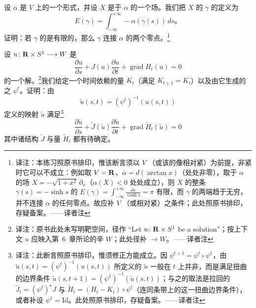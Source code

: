 \begin{exercise}\label{ex:ch14-027-energy-trajectory}
设 $\alpha$ 是\trManifold{} $V$ 上的一个\trClosed{}形式，并设 $X$ 是\trAdapted{}于 $\alpha$ 的一个\trPseudogradient{}场。我们把\trVectorField{} $X$ 的\trTrajectory{} $\gamma$ 的\trEnergy{}定义为
\[
E(\gamma)=\int_{-\infty}^{+\infty}-\alpha(\dot{\gamma}(s))\,ds\text{。}
\]
证明：若 $\gamma$ 的\trEnergy{}是有限的，那么 $\gamma$ 连接 $\alpha$ 的两个零点。\footnote{译注：本练习照原书排印，惟该断言须以 $V$ \trCompact{}（或该\trTrajectory{}的像相对紧）为前提，非紧时它可以不成立：例如取 $V=\mathbf{R}$、$\alpha=d(\arctan x)$（处处非零），取\trAdapted{}于 $\alpha$ 的\trPseudogradient{}场 $X=-\sqrt{1+x^{2}}\,\partial_x$（$\alpha(X)<0$ 处处成立），则 $X$ 的整条\trTrajectory{} $\gamma(s)=-\sinh s$ 的\trEnergy{} $E(\gamma)=\int_{-\infty}^{+\infty}\frac{ds}{\cosh s}=\pi$ 有限，而 $\gamma$ 的两端趋于无穷，并不连接 $\alpha$ 的任何零点。故应补 $V$ \trCompact{}（或\trTrajectory{}相对紧）之条件；此处照原书排印，存疑备案。——译者注}
\end{exercise}

\begin{exercise}\label{ex:ch14-028-floer-equation-naturality}
设 $u\colon\mathbf{R}\times S^1\longrightarrow W$ 是\trFloerEquation
\[
\frac{\partial u}{\partial s}+J(u)\frac{\partial u}{\partial t}+\operatorname{grad}H_t(u)=0
\]
的一个解。\footnote{译注：原书此处未写明靶空间，径作 “Let $u\colon\mathbf{R}\times S^{1}$ be a solution”；按上下文 $u$ 应映入第~6~章所论的辛\trManifold{} $W$；此处径补 $\longrightarrow W$。——译者注}我们给定一个时间依赖的\trHamiltonian{}量 $K_t$（满足 $K_{t+1}=K_t$）以及由它生成的\trSymplectic\trDiffeomorphism{}之\trFlow{} $\psi^t$。证明：由
\[
\widetilde{u}(s,t)=(\psi^t)^{-1}(u(s,t))
\]
定义的映射 $\widetilde{u}$ 满足\footnote{译注：此断言照原书排印，惟须修正方能成立。因 $\psi^{t+1}=\psi^{t}\circ\psi^{1}$，由 $\widetilde{u}(s,t)=(\psi^{t})^{-1}(u(s,t))$ 所定义的 $\widetilde{u}$ 一般在 $t$ 上并非\trPeriodic，而是满足扭曲的边界条件 $\widetilde{u}(s,t+1)=(\psi^{1})^{-1}(\widetilde{u}(s,t))$；与之\trCompatible{}的取法是拉回的 $\widetilde{J}_t=(\psi^{t})^{\star}J$ 与 $\widetilde{H}_t=(H_t-K_t)\circ\psi^{t}$（连同条带上的这一扭曲边界条件），或者补设 $\psi^{1}=\mathrm{Id}$。此处照原书排印，存疑备案。——译者注}
\[
\frac{\partial\widetilde{u}}{\partial s}
+\widetilde{J}(\widetilde{u})\frac{\partial\widetilde{u}}{\partial t}
+\operatorname{grad}\widetilde{H}_t(\widetilde{u})=0
\]
其中诸\trAlmostComplex{}结构 $\widetilde{J}$ 与\trHamiltonian{}量 $\widetilde{H}_t$ 都有待确定。
\end{exercise}

